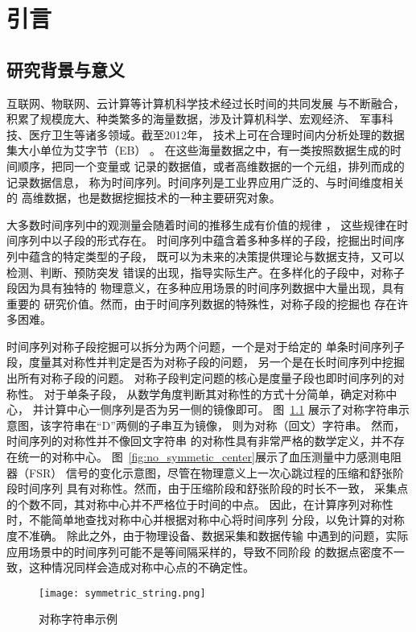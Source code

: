 
\chapter{引言}

\section{研究背景与意义}
互联网、物联网、云计算等计算机科学技术经过长时间的共同发展
与不断融合，积累了规模庞大、种类繁多的海量数据，涉及计算机科学、宏观经济、
军事科技、医疗卫生等诸多领域\cite{2022968}。截至2012年，
技术上可在合理时间内分析处理的数据集大小单位为艾字节（EB）
\cite{DBLP:journals/jbd/TsaiLCV15}。
在这些海量数据之中，有一类按照数据生成的时间顺序，把同一个变量或
记录的数据值，或者高维数据的一个元组，排列而成的记录数据信息，
称为时间序列。时间序列是工业界应用广泛的、与时间维度相关的
高维数据，也是数据挖掘技术的一种主要研究对象。

大多数时间序列中的观测量会随着时间的推移生成有价值的规律
\cite{DBLP:conf/sdm/MueenKZCW09}，
这些规律在时间序列中以子段的形式存在。
时间序列中蕴含着多种多样的子段，挖掘出时间序列中蕴含的特定类型的子段，
既可以为未来的决策提供理论与数据支持，又可以检测、判断、预防突发
错误的出现，指导实际生产。在多样化的子段中，对称子段因为具有独特的
物理意义，在多种应用场景的时间序列数据中大量出现，具有重要的
研究价值\cite{2022968}。然而，由于时间序列数据的特殊性，对称子段的挖掘也
存在许多困难。

时间序列对称子段挖掘可以拆分为两个问题，一个是对于给定的
单条时间序列子段，度量其对称性并判定是否为对称子段的问题，
另一个是在长时间序列中挖掘出所有对称子段的问题。
对称子段判定问题的核心是度量子段也即时间序列的对称性。
对于单条子段，
从数学角度判断其对称性的方式十分简单，确定对称中心，
并计算中心一侧序列是否为另一侧的镜像即可。
图~\ref{fig:symmetric_string}
展示了对称字符串示意图，该字符串在“D”两侧的子串互为镜像，
则为对称（回文）字符串\cite{DBLP:journals/corr/abs-2003-08211}。
然而，时间序列的对称性并不像回文字符串
的对称性具有非常严格的数学定义，并不存在统一的对称中心。
图~\ref{fig:no_symmetic_center}展示了血压测量中力感测电阻器（FSR）
信号的变化示意图，尽管在物理意义上一次心跳过程的压缩和舒张阶段时间序列
具有对称性。然而，由于压缩阶段和舒张阶段的时长不一致，
采集点的个数不同，其对称中心并不严格位于时间的中点。
因此，在计算序列对称性时，不能简单地查找对称中心并根据对称中心将时间序列
分段，以免计算的对称度不准确\cite{DBLP:journals/csda/DaiNG18}。
除此之外，由于物理设备、数据采集和数据传输
中遇到的问题，实际应用场景中的时间序列可能不是等间隔采样的，导致不同阶段
的数据点密度不一致，这种情况同样会造成对称中心点的不确定性。
\begin{figure}
  \centering
  \texttt{[image: symmetric\_string.png]}
  \caption{对称字符串示例}
  \label{fig:symmetric_string}
\end{figure}

